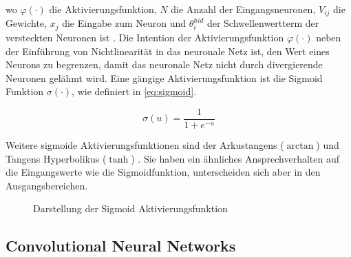 wo $\varphi(\cdot)$ die Aktivierungsfunktion, $N$ die Anzahl der Eingangsneuronen, $V_{ij}$ die Gewichte, $x_{j}$ die Eingabe zum Neuron und $\theta_{i}^{hid}$ der Schwellenwertterm der versteckten Neuronen ist \cites[81-100]{Wang2003}[195-201]{Networks1995}. Die Intention der Aktivierungsfunktion $\varphi(\cdot)$ neben der Einführung von Nichtlinearität in das neuronale Netz ist, den Wert eines Neurons zu begrenzen, damit das neuronale Netz nicht durch divergierende Neuronen gelähmt wird. Eine gängige Aktivierungsfunktion ist die Sigmoid Funktion $\sigma(\cdot)$, wie definiert in \ref{eq:sigmoid}.

\begin{equation}\label{eq:sigmoid}
	\sigma(u) = \frac{1}{1 + e^{-u}}
\end{equation}


Weitere sigmoide Aktivierungsfunktionen sind der Arkustangens ($\arctan$) und Tangens Hyperbolikus ($\tanh$) \cite[195-201]{Networks1995}. Sie haben ein ähnliches Ansprechverhalten auf die Eingangswerte wie die Sigmoidfunktion, unterscheiden sich aber in den Ausgangsbereichen. 

\begin{figure}[htb]
\centering
{}
\caption{Darstellung der Sigmoid Aktivierungsfunktion}
\end{figure}

\subsection{Convolutional Neural Networks}

